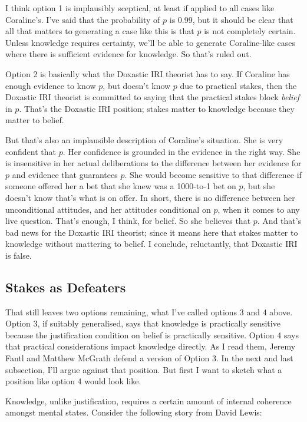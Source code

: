 \documentclass[11pt,oneside]{book}
\begin{document}
\noindent I think option 1 is implausibly sceptical, at least if applied to all cases like Coraline's. I've said that the probability of $p$ is 0.99, but it should be clear that all that matters to generating a case like this is that $p$ is not completely certain. Unless knowledge requires certainty, we'll be able to generate Coraline-like cases where there is sufficient evidence for knowledge. So that's ruled out.

Option 2 is basically what the Doxastic IRI theorist has to say. If Coraline has enough evidence to know $p$, but doesn't know $p$ due to practical stakes, then the Doxastic IRI theorist is committed to saying that the practical stakes block \textit{belief} in $p$. That's the Doxastic IRI position; stakes matter to knowledge because they matter to belief.

But that's also an implausible description of Coraline's situation. She is very confident that $p$. Her confidence is grounded in the evidence in the right way. She is insensitive in her actual deliberations to the difference between her evidence for $p$ and evidence that guarantees $p$. She would become sensitive to that difference if someone offered her a bet that she knew was a 1000-to-1 bet on $p$, but she doesn't know that's what is on offer. In short, there is no difference between her unconditional attitudes, and her attitudes conditional on $p$, when it comes to any live question. That's enough, I think, for belief. So she believes that $p$. And that's bad news for the Doxastic IRI theorist; since it means here that stakes matter to knowledge without mattering to belief. I conclude, reluctantly, that Doxastic IRI is false.

\subsection{Stakes as Defeaters}

That still leaves two options remaining, what I've called options 3 and 4 above. Option 3, if suitably generalised, says that knowledge is practically sensitive because the justification condition on belief is practically sensitive. Option 4 says that practical considerations impact knowledge directly. As I read them, Jeremy Fantl and Matthew McGrath defend a version of Option 3. In the next and last subsection, I'll argue against that position. But first I want to sketch what a position like option 4 would look like. 

Knowledge, unlike justification, requires a certain amount of internal coherence amongst mental states. Consider the following story from David Lewis:
\end{document}
